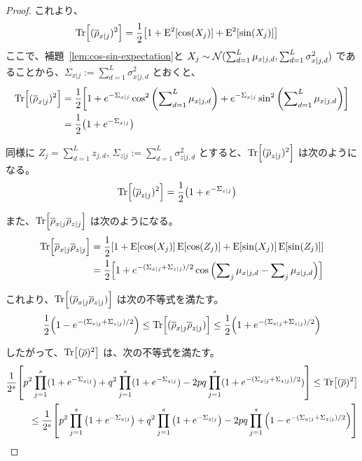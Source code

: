 \begin{proof}
    これより、
    \begin{align}
        \Tr[(\overline{\rho}_{x|j})^2]
        &= \frac12\qty[1 + \operatorname{E}^2[\cos(X_j)] + \operatorname{E}^2[\sin(X_j)]]
    \end{align}
    ここで、補題~\ref{lem:cos-sin-expectation}と $X_j \sim \mathcal{N}(\sum_{d=1}^L \mu_{x|j,d}, \sum_{d=1}^L \sigma_{x|j,d}^2)$ であることから、$\Sigma_{x|j}:=\sum_{d=1}^L \sigma_{x|j,d}^2$ とおくと、
    \begin{align}
        \Tr[(\overline{\rho}_{x|j})^2]
        &= \frac12\qty[1 + e^{-\Sigma_{x|j}}\cos^2\qty(\sum\nolimits_{d=1}^L \mu_{x|j,d}) + e^{-\Sigma_{x|j}}\sin^2\qty(\sum\nolimits_{d=1}^L \mu_{x|j,d})]\nonumber\\
        &= \frac12\qty(1 + e^{-\Sigma_{x|j}})
    \end{align}
    
    同様に $Z_j = \sum_{d=1}^L z_{j,d}$, $\Sigma_{z|j}:=\sum_{d=1}^L \sigma_{z|j,d}^2$ とすると、$\Tr[(\overline{\rho}_{z|j})^2]$ は次のようになる。
    \begin{align}
        \Tr[(\overline{\rho}_{z|j})^2]
        &= \frac12\qty(1 + e^{-\Sigma_{z|j}})
    \end{align}

    また、$\Tr[\overline{\rho}_{x|j}\overline{\rho}_{z|j}]$ は次のようになる。    
    \begin{align}
        \Tr[\overline{\rho}_{x|j}\overline{\rho}_{z|j}]
        &= \frac12\qty[1 + \operatorname{E}[\cos(X_j)]\operatorname{E}[\cos(Z_j)] + \operatorname{E}[\sin(X_j)]\operatorname{E}[\sin(Z_j)]]\nonumber\\
        &= \frac12\qty[1 + e^{-(\Sigma_{x|j}+\Sigma_{z|j})/2}\cos\qty(\sum\nolimits_j \mu_{x|j,d} - \sum\nolimits_j \mu_{z|j,d})]
    \end{align}
    
    これより、$\Tr[(\overline{\rho}_{x|j}\overline{\rho}_{z|j})]$ は次の不等式を満たす。
    \begin{align}
        \frac12\qty(1 - e^{-(\Sigma_{x|j}+\Sigma_{z|j})/2})
        \leq \Tr[(\overline{\rho}_{x|j}\overline{\rho}_{z|j})]
        \leq \frac12\qty(1 + e^{-(\Sigma_{x|j}+\Sigma_{z|j})/2})
    \end{align}
    
    したがって、$\Tr[(\overline{\rho})^2]$ は、次の不等式を満たす。
    \begin{align}\label{eq:ineq-1}
        \frac{1}{2^s}
        \qty[
            p^2\prod_{j=1}^s(1 + e^{-\Sigma_{x|j}})
            + q^2\prod_{j=1}^s(1 + e^{-\Sigma_{z|j}})
            - 2pq\prod_{j=1}^s(1 + e^{-(\Sigma_{x|j}+\Sigma_{z|j})/2})
        ]
        \leq \Tr[(\overline{\rho})^2]\nonumber\\
        \leq
        \frac{1}{2^s}
        \qty[
            p^2\prod_{j=1}^s\qty(1 + e^{-\Sigma_{x|j}})
            + q^2\prod_{j=1}^s\qty(1 + e^{-\Sigma_{z|j}})
            - 2pq\prod_{j=1}^s\qty(1 - e^{-(\Sigma_{x|j}+\Sigma_{z|j})/2})
        ]
    \end{align}
    

\end{proof}
